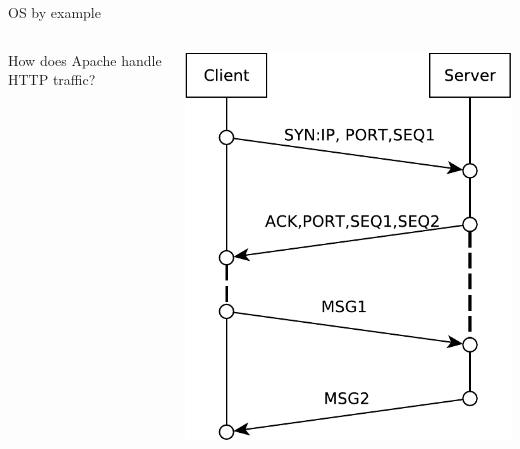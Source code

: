 \documentclass{beamer}
\begin{document}
\begin{frame}[t]{OS by example}
\begin{columns}
\begin{column}[t]{0.5\textwidth}
  How does Apache handle HTTP traffic?
\end{column}
\begin{column}[t]{0.5\textwidth}
  \includegraphics[width=0.9\linewidth]{open}
\end{column}
\end{columns}
\end{frame}
\end{document}
